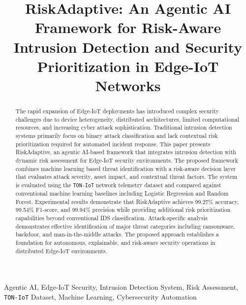 \documentclass[conference]{IEEEtran}
\begin{document}
\title{RiskAdaptive: An Agentic AI Framework for Risk-Aware Intrusion Detection and Security Prioritization in Edge-IoT Networks}

\author{
}

\maketitle

\begin{abstract}
The rapid expansion of Edge-IoT deployments has introduced complex security challenges due to device heterogeneity, distributed architectures, limited computational resources, and increasing cyber attack sophistication. Traditional intrusion detection systems primarily focus on binary attack classification and lack contextual risk prioritization required for automated incident response. This paper presents RiskAdaptive, an agentic AI-based framework that integrates intrusion detection with dynamic risk assessment for Edge-IoT security environments. The proposed framework combines machine learning based threat identification with a risk-aware decision layer that evaluates attack severity, asset impact, and contextual threat factors. The system is evaluated using the \texttt{TON-IoT} network telemetry dataset and compared against conventional machine learning baselines including Logistic Regression and Random Forest. Experimental results demonstrate that RiskAdaptive achieves 99.27\% accuracy, 99.54\% F1-score, and 99.94\% precision while providing additional risk prioritization capabilities beyond conventional IDS classification. Attack-specific analysis demonstrates effective identification of major threat categories including ransomware, backdoor, and man-in-the-middle attacks. The proposed approach establishes a foundation for autonomous, explainable, and risk-aware security operations in distributed Edge-IoT environments.
\end{abstract}

\begin{IEEEkeywords}
Agentic AI, Edge-IoT Security, Intrusion Detection System, Risk Assessment, \texttt{TON-IoT} Dataset, Machine Learning, Cybersecurity Automation
\end{IEEEkeywords}
\end{document}
